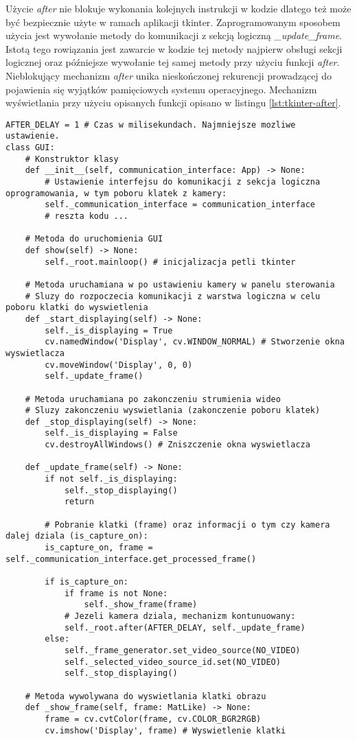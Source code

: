 Użycie \emph{after} nie blokuje wykonania kolejnych instrukcji w kodzie dlatego też może być bezpiecznie użyte w ramach aplikacji tkinter. Zaprogramowanym sposobem użycia jest wywołanie metody do komunikacji z sekcją logiczną \emph{\_update\_frame}. Istotą tego rowiązania jest zawarcie w kodzie tej metody najpierw obsługi sekcji logicznej oraz późniejsze wywołanie tej samej metody przy użyciu funkcji \emph{after}. Nieblokujący mechanizm \emph{after} unika nieskończonej rekurencji prowadzącej do pojawienia się wyjątków pamięciowych systemu operacyjnego. Mechanizm wyświetlania przy użyciu opisanych funkcji opisano w listingu \ref{lst:tkinter-after}.

\begin{lstlisting}[caption={Wyświetlanie klatek obrazu w GUI przy pomocy modułu tkinter.}, label={lst:tkinter-after}]
AFTER_DELAY = 1 # Czas w milisekundach. Najmniejsze mozliwe ustawienie. 
class GUI:
    # Konstruktor klasy
    def __init__(self, communication_interface: App) -> None:
        # Ustawienie interfejsu do komunikacji z sekcja logiczna oprogramowania, w tym poboru klatek z kamery:
        self._communication_interface = communication_interface
        # reszta kodu ...

    # Metoda do uruchomienia GUI
    def show(self) -> None:
        self._root.mainloop() # inicjalizacja petli tkinter

    # Metoda uruchamiana w po ustawieniu kamery w panelu sterowania
    # Sluzy do rozpoczecia komunikacji z warstwa logiczna w celu poboru klatki do wyswietlenia  
    def _start_displaying(self) -> None:
        self._is_displaying = True
        cv.namedWindow('Display', cv.WINDOW_NORMAL) # Stworzenie okna wyswietlacza
        cv.moveWindow('Display', 0, 0)
        self._update_frame()

    # Metoda uruchamiana po zakonczeniu strumienia wideo
    # Sluzy zakonczeniu wyswietlania (zakonczenie poboru klatek)
    def _stop_displaying(self) -> None:
        self._is_displaying = False
        cv.destroyAllWindows() # Zniszczenie okna wyswietlacza

    def _update_frame(self) -> None:
        if not self._is_displaying:
            self._stop_displaying()
            return

        # Pobranie klatki (frame) oraz informacji o tym czy kamera dalej dziala (is_capture_on):
        is_capture_on, frame =  self._communication_interface.get_processed_frame()

        if is_capture_on:
            if frame is not None:
                self._show_frame(frame)
            # Jezeli kamera dziala, mechanizm kontunuowany:
            self._root.after(AFTER_DELAY, self._update_frame)
        else:
            self._frame_generator.set_video_source(NO_VIDEO)
            self._selected_video_source_id.set(NO_VIDEO)
            self._stop_displaying()

    # Metoda wywolywana do wyswietlania klatki obrazu
    def _show_frame(self, frame: MatLike) -> None:
        frame = cv.cvtColor(frame, cv.COLOR_BGR2RGB)
        cv.imshow('Display', frame) # Wyswietlenie klatki
\end{lstlisting}

